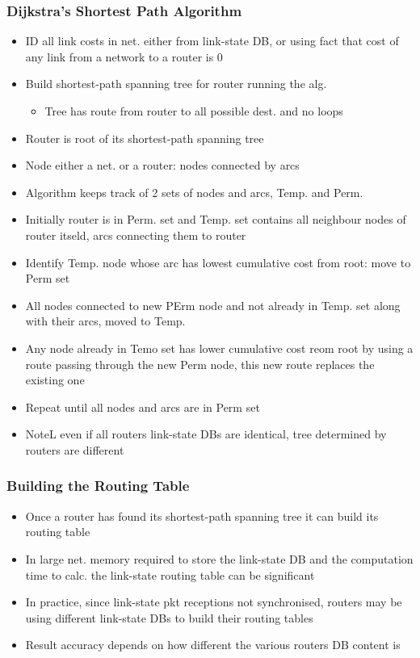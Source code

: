 \subsubsection{Dijkstra's Shortest Path Algorithm}
\begin{itemize}
	\item ID all link costs in net. either from link-state DB, or using fact
		that cost of any link from a network to a router is 0
	\item Build shortest-path spanning tree for router running the alg.
	\begin{itemize}
		\item Tree has route from router to all possible dest. and no
			loops
	\end{itemize}
	\item Router is root of its shortest-path spanning tree
	\item Node either a net. or a router: nodes connected by arcs
	\item Algorithm keeps track of 2 sets of nodes and arcs, Temp. and Perm.
	\item Initially router is in Perm. set and Temp. set contains all
		neighbour nodes of router itseld, arcs connecting them to
		router
	\item Identify Temp. node whose arc has lowest cumulative cost from
		root: move to Perm set
	\item All nodes connected to new PErm node and not already in Temp. set
		along with their arcs, moved to Temp.
	\item Any node already in Temo set has lower cumulative cost reom root
		by using a route passing through the new Perm node, this new
		route replaces the existing one
	\item Repeat until all nodes and arcs are in Perm set
	\item NoteL even if all routers link-state DBs are identical, tree
		determined by routers are different
\end{itemize}
\subsubsection{Building the Routing Table}
\begin{itemize}
	\item Once a router has found its shortest-path spanning tree it can
		build its routing table
	\item In large net. memory required to store the link-state DB and the
		computation time to calc. the link-state routing table can be
		significant
	\item In practice, since link-state pkt receptions not synchronised,
		routers may be using different link-state DBs to build their
		routing tables
	\item Result accuracy depends on how different the various routers DB
		content is
\end{itemize}
